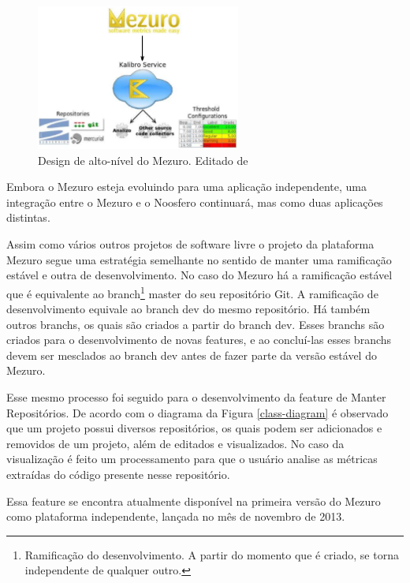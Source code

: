\graphicspath{{figuras/}}
\begin{figure}[H]
\centering
\includegraphics[width=0.6\textwidth]{mezuro-standalone-design}
\caption{Design de alto-nível do Mezuro. Editado de \cite{meirelles2010mezuro}}
\label{mezuro-design}
\end{figure}

Embora o Mezuro esteja evoluindo para uma aplicação independente, uma integração entre o Mezuro e o Noosfero continuará, mas como duas aplicações distintas.

Assim como vários outros projetos de software livre o projeto da plataforma Mezuro segue uma estratégia semelhante no sentido de manter uma ramificação estável e outra de desenvolvimento. No caso do Mezuro há a ramificação estável que é equivalente ao branch\footnote{Ramificação do desenvolvimento. A partir do momento que é criado, se torna independente de qualquer outro.} master do seu repositório Git. A ramificação de desenvolvimento equivale ao branch dev do mesmo repositório. Há também outros branchs, os quais são criados a partir do branch dev. Esses branchs são criados para o desenvolvimento de novas features, e ao concluí-las esses branchs devem ser mesclados ao branch dev antes de fazer parte da versão estável do Mezuro.

Esse mesmo processo foi seguido para o desenvolvimento da feature de Manter Repositórios. De acordo com o diagrama da Figura \ref{class-diagram} é observado que um projeto possui diversos repositórios, os quais podem ser adicionados e removidos de um projeto, além de editados e visualizados. No caso da visualização é feito um processamento para que o usuário analise as métricas extraídas do código presente nesse repositório. 

Essa feature se encontra atualmente disponível na primeira versão do Mezuro como plataforma independente, lançada no mês de novembro de 2013.

